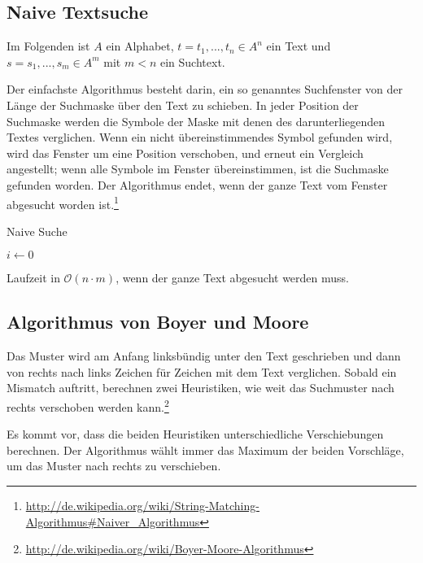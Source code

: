 \subsection{Naive Textsuche}
Im Folgenden ist \(A\) ein Alphabet, \(t = t_1,...,t_n \in A^n\) ein Text und \(s = s_1,...,s_m \in A^m\) mit \(m<n\) ein Suchtext.

Der einfachste Algorithmus besteht darin, ein so genanntes Suchfenster von der Länge der Suchmaske über den Text zu schieben. In jeder Position der Suchmaske werden die Symbole der Maske mit denen des darunterliegenden Textes verglichen. Wenn ein nicht übereinstimmendes Symbol gefunden wird, wird das Fenster um eine Position verschoben, und erneut ein Vergleich angestellt; wenn alle Symbole im Fenster übereinstimmen, ist die Suchmaske gefunden worden. Der Algorithmus endet, wenn der ganze Text vom Fenster abgesucht worden ist.\footnote{\url{http://de.wikipedia.org/wiki/String-Matching-Algorithmus\#Naiver_Algorithmus}}

\begin{algorithm}[H]
	\caption{Naive Suche}

	\BlankLine

	$i \longleftarrow 0$\newline
\end{algorithm}
Laufzeit in \(\mathcal{O}(n\cdot m)\), wenn der ganze Text abgesucht werden muss.

\subsection{Algorithmus von Boyer und Moore}
Das Muster wird am Anfang linksbündig unter den Text geschrieben und dann von rechts nach links Zeichen für Zeichen mit dem Text verglichen. Sobald ein Mismatch auftritt, berechnen zwei Heuristiken, wie weit das Suchmuster nach rechts verschoben werden kann.\footnote{\url{http://de.wikipedia.org/wiki/Boyer-Moore-Algorithmus}}

Es kommt vor, dass die beiden Heuristiken unterschiedliche Verschiebungen berechnen. Der Algorithmus wählt immer das Maximum der beiden Vorschläge, um das Muster nach rechts zu verschieben.

